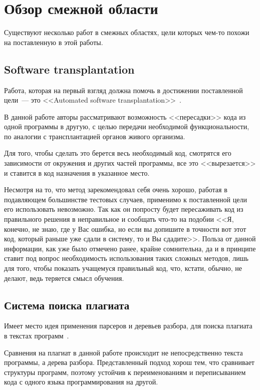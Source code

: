 \startrelatedwork

\section{Обзор смежной области}
Существуют несколько работ в смежных областях, цели которых чем-то похожи на поставленную в этой работы.

\subsection{Software transplantation}
Работа, которая на первый взгляд должна помочь в достижении поставленной цели~--- 
это <<Automated software transplantation>>~\cite{software-transplantation}.

В данной работе авторы рассматривают возможность <<пересадки>> кода из одной программы в другую, с целью передачи 
необходимой функциональности, по аналогии с трансплантацией органов живого организма.

Для того, чтобы сделать это берется весь необходимый код, смотрятся его зависимости от окружения и других частей программы, 
все это <<вырезается>> и ставится в код назначения в указанное место.

Несмотря на то, что метод зарекомендовал себя очень хорошо, работая в подавляющем большинстве тестовых случаев, применимо к поставленной
цели его использовать невозможно. Так как он попросту будет пересаживать код из правильного решения в неправильное и сообщать
что-то на подобии <<Я, конечно, не знаю, где у Вас ошибка, но если вы допишите в точности вот этот код, 
который раньше уже сдали в систему, то и Вы сдадите>>. Польза от данной информации, как уже было отмечено ранее, крайне сомнительна,
да и в принципе ставит под вопрос необходимость использования таких сложных методов, лишь для того, чтобы показать учащемуся
правильный код, что, кстати, обычно, не делают, ведь теряется смысл обучения.

\subsection{Система поиска плагиата}
Имеет место идея применения парсеров и деревьев разбора, для поиска плагиата в текстах программ~\cite{anti-plagiat}.

Сравнения на плагиат в данной работе происходит не непосредственно текста программы, а дерева разбора. Представленный
подход хорош тем, что сравнивает структуры программ, поэтому устойчив к переименованиям и переписыванием кода
с одного языка программирования на другой.

